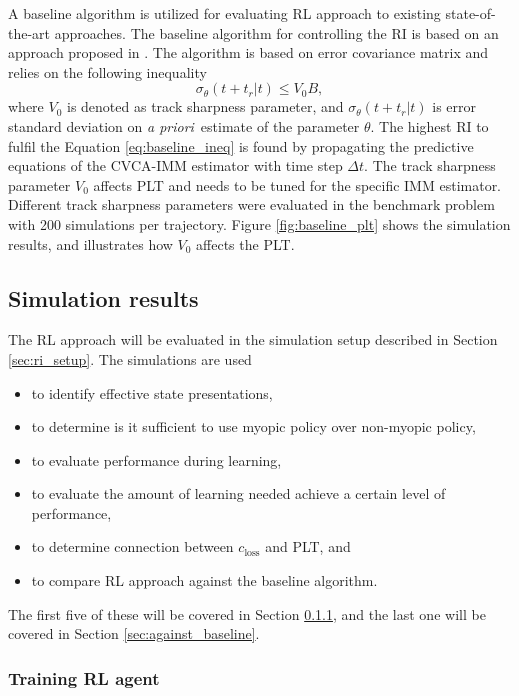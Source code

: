 \documentclass[english, 12pt, a4paper, elec, utf8, a-1b, online]{aaltothesis}
\def\prior{\textit{a priori}\ }
\newcommand{\dt}{\Delta t}
\newcommand{\closs}{c_\text{loss}}
\begin{document}
A baseline algorithm is utilized for evaluating RL approach to existing state-of-the-art approaches. 
The baseline algorithm for controlling the RI is based on an approach proposed in \cite{Daeipour1994}.
The algorithm is based on error covariance matrix and relies on the following inequality
\begin{equation}\label{eq:baseline_ineq}
    \sigma_\theta(t+t_r|t) \leq V_0 B, 
\end{equation}
where $V_0$ is denoted as track sharpness parameter, and $\sigma_\theta(t+t_r|t)$ is error standard deviation on \prior estimate of the parameter $\theta$.
The highest RI to fulfil the Equation \eqref{eq:baseline_ineq} is found by propagating the predictive equations of the CVCA-IMM estimator with time step $\dt$.
The track sharpness parameter $V_0$ affects PLT and needs to be tuned for the specific IMM estimator.
Different track sharpness parameters were evaluated in the benchmark problem with 200 simulations per trajectory.
Figure \ref{fig:baseline_plt} shows the simulation results, and illustrates how $V_0$ affects the PLT. 


\subsection{Simulation results}\label{sec:ri_sim}

The RL approach will be evaluated in the simulation setup described in Section \ref{sec:ri_setup}.
The simulations are used
\begin{itemize}
    \item to identify effective state presentations,
    \item to determine is it sufficient to use myopic policy over non-myopic policy,
    \item to evaluate performance during learning,
    \item to evaluate the amount of learning needed achieve a certain level of performance,
    \item to determine connection between $\closs$ and PLT, and
    \item to compare RL approach against the baseline algorithm.
\end{itemize}
The first five of these will be covered in Section \ref{sec:training}, and the last one will be covered in Section \ref{sec:against_baseline}.

\subsubsection{Training RL agent}\label{sec:training}
\end{document}
